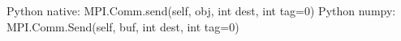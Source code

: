 Python native:
MPI.Comm.send(self, obj, int dest, int tag=0)
Python numpy:
MPI.Comm.Send(self, buf, int dest, int tag=0)
